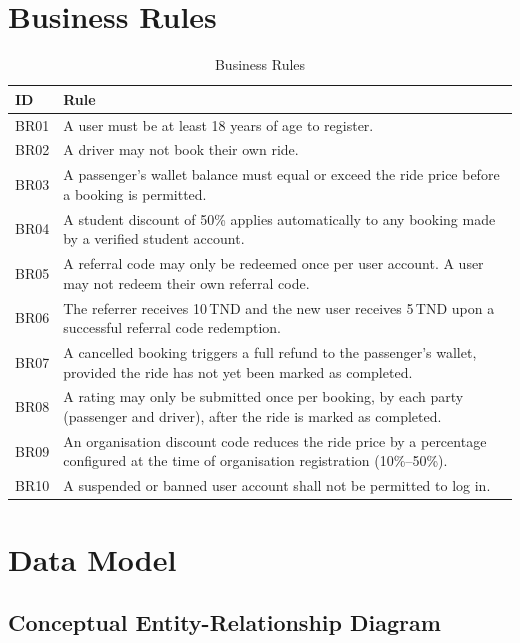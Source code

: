 \documentclass[12pt,a4paper,openright]{report}
\begin{document}
\section{Business Rules}

\begin{table}[H]
\centering
\caption{Business Rules}
\label{tab:business-rules}
\begin{tabularx}{\textwidth}{l X}
\toprule
\textbf{ID} & \textbf{Rule} \\
\midrule
BR01 & A user must be at least 18 years of age to register. \\
BR02 & A driver may not book their own ride. \\
BR03 & A passenger's wallet balance must equal or exceed the ride price before a booking is permitted. \\
BR04 & A student discount of 50\% applies automatically to any booking made by a verified student account. \\
BR05 & A referral code may only be redeemed once per user account. A user may not redeem their own referral code. \\
BR06 & The referrer receives 10\,TND and the new user receives 5\,TND upon a successful referral code redemption. \\
BR07 & A cancelled booking triggers a full refund to the passenger's wallet, provided the ride has not yet been marked as completed. \\
BR08 & A rating may only be submitted once per booking, by each party (passenger and driver), after the ride is marked as completed. \\
BR09 & An organisation discount code reduces the ride price by a percentage configured at the time of organisation registration (10\%–50\%). \\
BR10 & A suspended or banned user account shall not be permitted to log in. \\
\bottomrule
\end{tabularx}
\end{table}

\section{Data Model}

\subsection{Conceptual Entity-Relationship Diagram}
\end{document}
